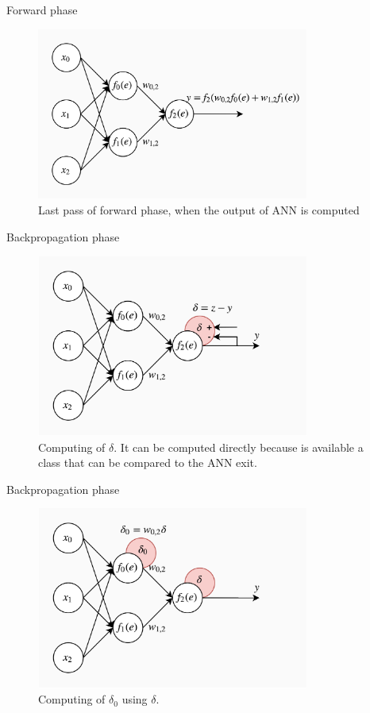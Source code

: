 \documentclass[xcolor={usenames}]{beamer}
\begin{document}
  \begin{frame}{Forward phase}
  	\begin{figure}
  		\centering
  		\includegraphics[width=0.8\textwidth]{../figures/forward-propagation.png}
  		\caption{Last pass of forward phase, when the output of ANN is computed}
  	\end{figure}
  \end{frame}
  \begin{frame}{Backpropagation phase}
  	\begin{figure}
  		\centering
  		\includegraphics[width=0.8\textwidth]{../figures/backward-propagation-0.png}
  		\caption{Computing of $\delta$. It can be computed directly because is available a class that can be compared to the ANN exit.}
  	\end{figure}
  \end{frame}
  \begin{frame}{Backpropagation phase}
  	\begin{figure}
  		\centering
  		\includegraphics[width=0.8\textwidth]{../figures/backward-propagation-1.png}
  		\caption{Computing of $\delta_0$ using $\delta$.}
  	\end{figure}
  \end{frame}
\end{document}
